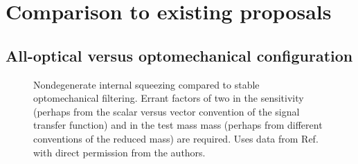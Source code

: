 




\section{Comparison to existing proposals}

\subsection{All-optical versus optomechanical configuration}

\begin{figure}
	\centering
	\caption{Nondegenerate internal squeezing compared to stable optomechanical filtering. Errant  factors of two in the sensitivity (perhaps from the scalar versus vector convention of the signal transfer function) and in the test mass mass (perhaps from different conventions of the reduced mass) are required. Uses data from Ref.~\cite{} with direct permission from the authors.}
	\label{fig:}
\end{figure}




